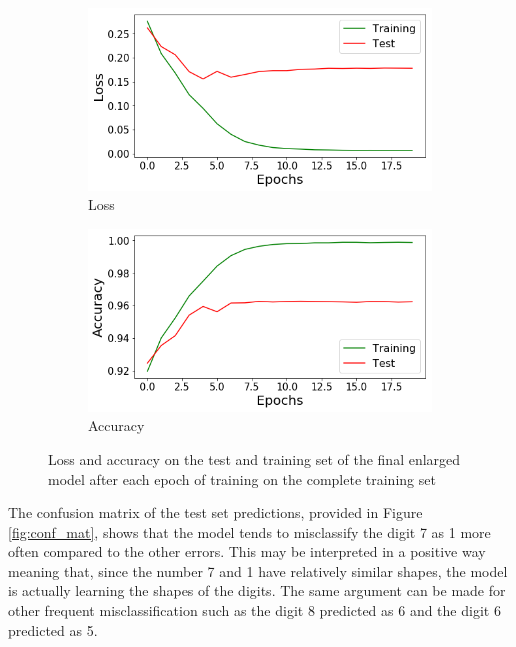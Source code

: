 \documentclass[12pt]{article}
\begin{document}
\begin{figure}[h]
	\centering
	\begin{subfigure}{0.49\textwidth}
		\includegraphics[width=\linewidth]{train_loss}
		\caption{Loss}
		\label{fig:trainA}
	\end{subfigure}
	\hspace*{\fill} %
	\begin{subfigure}{0.49\textwidth}
		\includegraphics[width=\linewidth]{train_acc}
		\caption{Accuracy}
		\label{fig:trainB}
	\end{subfigure}
	\caption{Loss and accuracy on the test and training set of the final enlarged model after each epoch of training on the complete training set}
	\label{fig:train_graphs}
\end{figure}

The confusion matrix of the test set predictions, provided in Figure \ref{fig:conf_mat}, shows that the model tends to misclassify the digit 7 as 1 more often compared to the other errors. This may be interpreted in a positive way meaning that, since the number 7 and 1 have relatively similar shapes, the model is actually learning the shapes of the digits. The same argument can be made for other frequent misclassification such as the digit 8 predicted as 6 and the digit 6 predicted as 5.
\end{document}
